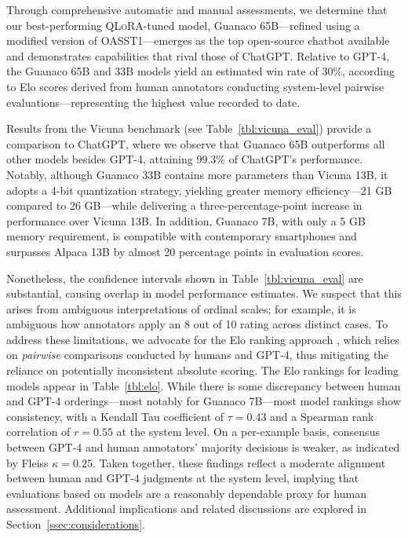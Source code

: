 Through comprehensive automatic and manual assessments, we determine that our best-performing \textsc{QLoRA}-tuned model, {Guanaco} 65B—refined using a modified version of OASST1—emerges as the top open-source chatbot available and demonstrates capabilities that rival those of ChatGPT. Relative to GPT-4, the {Guanaco} 65B and 33B models yield an estimated win rate of 30\%, according to Elo scores derived from human annotators conducting system-level pairwise evaluations—representing the highest value recorded to date.

Results from the Vicuna benchmark \cite{vicuna2023} (see Table~\ref{tbl:vicuna_eval}) provide a comparison to ChatGPT, where we observe that {Guanaco} 65B outperforms all other models besides GPT-4, attaining 99.3\% of ChatGPT’s performance. Notably, although {Guanaco} 33B contains more parameters than Vicuna 13B, it adopts a 4-bit quantization strategy, yielding greater memory efficiency—21 GB compared to 26 GB—while delivering a three-percentage-point increase in performance over Vicuna 13B. In addition, {Guanaco} 7B, with only a 5 GB memory requirement, is compatible with contemporary smartphones and surpasses Alpaca 13B by almost 20 percentage points in evaluation scores.

Nonetheless, the confidence intervals shown in Table~\ref{tbl:vicuna_eval} are substantial, causing overlap in model performance estimates. We suspect that this arises from ambiguous interpretations of ordinal scales; for example, it is ambiguous how annotators apply an 8 out of 10 rating across distinct cases. To address these limitations, we advocate for the Elo ranking approach \citep{elo1967proposed}, which relies on \textit{pairwise} comparisons conducted by humans and GPT-4, thus mitigating the reliance on potentially inconsistent absolute scoring. The Elo rankings for leading models appear in Table~\ref{tbl:elo}. While there is some discrepancy between human and GPT-4 orderings—most notably for Guanaco 7B—most model rankings show consistency, with a Kendall Tau coefficient of $\tau=0.43$ and a Spearman rank correlation of $r=0.55$ at the system level. On a per-example basis, consensus between GPT-4 and human annotators’ majority decisions is weaker, as indicated by Fleiss $\kappa=0.25$. Taken together, these findings reflect a moderate alignment between human and GPT-4 judgments at the system level, implying that evaluations based on models are a reasonably dependable proxy for human assessment. Additional implications and related discussions are explored in Section~\ref{ssec:considerations}.

